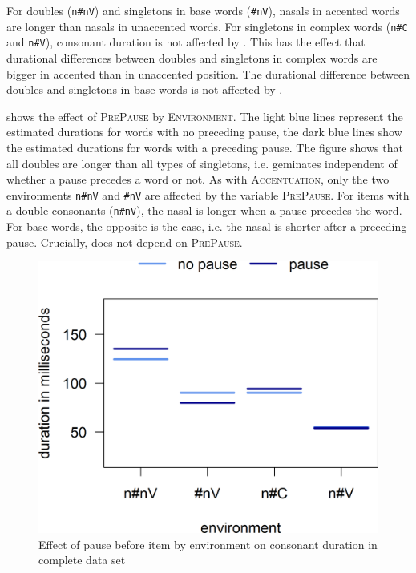  For  doubles (\texttt{n\#nV}) and singletons in base words (\texttt{\#nV}), nasals in accented words are longer than nasals in unaccented words.
For singletons in complex words (\texttt{n\#C} and \texttt{n\#V}), consonant duration is not affected by . This has the effect that durational differences between doubles and singletons in complex words are bigger in accented than in unaccented position. The durational difference between doubles and singletons in base words is not affected by .

 shows the effect of \textsc{PrePause} by \textsc{Environment}. The light blue lines represent the estimated durations for words with no preceding pause, the dark blue lines show the estimated durations for words with a preceding pause. 
The figure shows that all doubles are longer than all types of singletons, i.e.  geminates independent of whether a pause precedes a word or not.
As with \textsc{Accentuation}, only the two environments \texttt{n\#nV} and \texttt{\#nV} are affected by the variable \textsc{PrePause}. For items with a double consonants (\texttt{n\#nV}), the nasal is longer when a pause precedes the word. For base words, the opposite is the case, i.e. the nasal is shorter after a preceding pause.
Crucially,  does not depend on \textsc{PrePause}. 

\begin{figure}
\includegraphics [scale=0.5] {images/Experiment/unModelCompleteInterEnvPause}
\caption{Effect of pause before item by environment on consonant duration in complete data set}
\label{fig:NumNasal Pauseun experiment}
\end{figure}


